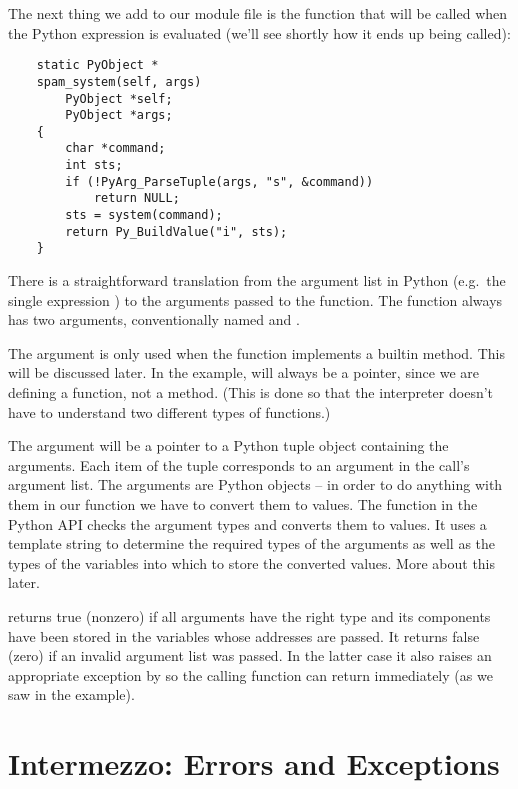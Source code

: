 \documentclass[twoside,openright]{report}
\begin{document}
The next thing we add to our module file is the \C{} function that will
be called when the Python expression 
is evaluated (we'll see shortly how it ends up being called):

\bcode\begin{verbatim}
    static PyObject *
    spam_system(self, args)
        PyObject *self;
        PyObject *args;
    {
        char *command;
        int sts;
        if (!PyArg_ParseTuple(args, "s", &command))
            return NULL;
        sts = system(command);
        return Py_BuildValue("i", sts);
    }
\end{verbatim}\ecode
%
There is a straightforward translation from the argument list in
Python (e.g.\ the single expression ) to the arguments
passed to the \C{} function.  The \C{} function always has two arguments,
conventionally named  and .

The  argument is only used when the \C{} function implements a
builtin method.  This will be discussed later. In the example,
 will always be a \NULL{} pointer, since we are defining
a function, not a method.  (This is done so that the interpreter
doesn't have to understand two different types of \C{} functions.)

The  argument will be a pointer to a Python tuple object
containing the arguments.  Each item of the tuple corresponds to an
argument in the call's argument list.  The arguments are Python
objects -- in order to do anything with them in our \C{} function we have
to convert them to \C{} values.  The function 
in the Python API checks the argument types and converts them to \C{}
values.  It uses a template string to determine the required types of
the arguments as well as the types of the \C{} variables into which to
store the converted values.  More about this later.

 returns true (nonzero) if all arguments have
the right type and its components have been stored in the variables
whose addresses are passed.  It returns false (zero) if an invalid
argument list was passed.  In the latter case it also raises an
appropriate exception by so the calling function can return
\NULL{} immediately (as we saw in the example).


\section{Intermezzo: Errors and Exceptions}
\end{document}
